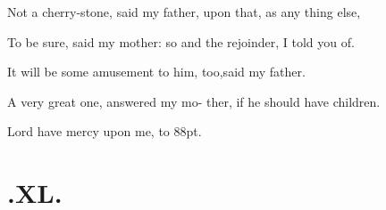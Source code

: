 \documentclass[twoside]{article}
\begin{document}
Not a cherry-stone, said my father,\tsk\break
{}
upon that, as any thing else,

\tsh To be sure, said my mother: so\break
{}
\tsk and the rejoinder, I told you of.

It will be some amusement to him,\break
too,\tsh said my father.

A very great one, answered my mo-\break
ther, if he should have children.\tsh

\tsh Lord have mercy upon me,\tsk\break
{}
\stick{\wastfill}
\stick{\wastfill}
\stick{\wastfill}
\hbox to 88pt{\wastfill.}

\vfill{}\eject
\setlength{\baselineskip}{12.7826pt}%
\setlength{\parskip}{7pt plus 4pt minus 4pt}%
\section{\topstrut{}.\enspace XL.}
\end{document}
